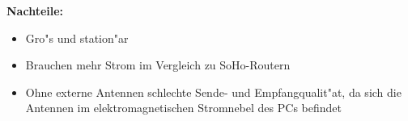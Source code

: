 \textbf{Nachteile: }

\begin{itemize}
\item Gro"s und station"ar
\item Brauchen mehr Strom im Vergleich zu SoHo-Routern
\item Ohne externe Antennen schlechte Sende- und Empfangqualit"at,
da sich die Antennen im elektromagnetischen Stromnebel des PCs befindet
\end{itemize}




